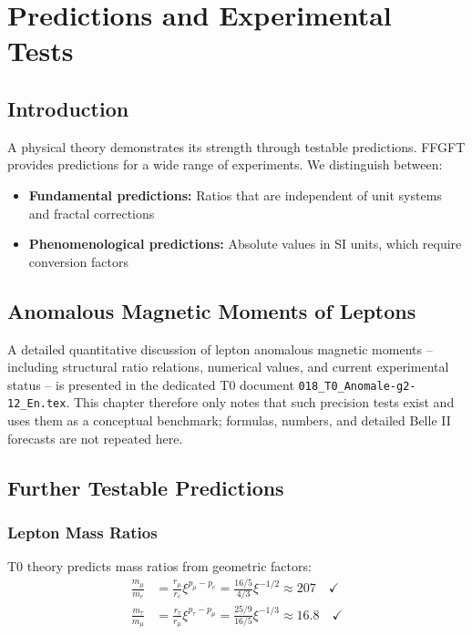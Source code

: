 
\chapter{Predictions and Experimental Tests}

\section{Introduction}

A physical theory demonstrates its strength through testable predictions. FFGFT provides predictions for a wide range of experiments. We distinguish between:

\begin{itemize}
	\item \textbf{Fundamental predictions:} Ratios that are independent of unit systems and fractal corrections
	\item \textbf{Phenomenological predictions:} Absolute values in SI units, which require conversion factors
\end{itemize}

\section{Anomalous Magnetic Moments of Leptons}

A detailed quantitative discussion of lepton anomalous magnetic moments – including structural ratio relations, numerical values, and current experimental status – is presented in the dedicated T0 document \texttt{018\_T0\_Anomale-g2-12\_En.tex}.
This chapter therefore only notes that such precision tests exist and uses them as a conceptual benchmark; formulas, numbers, and detailed Belle II forecasts are not repeated here.


\section{Further Testable Predictions}

\subsection{Lepton Mass Ratios}

T0 theory predicts mass ratios from geometric factors:
\begin{align}
	\frac{m_\mu}{m_e} &= \frac{r_\mu}{r_e} \xi^{p_\mu - p_e} = \frac{16/5}{4/3} \xi^{-1/2} 
	\approx 207 \quad \checkmark \\
	\frac{m_\tau}{m_\mu} &= \frac{r_\tau}{r_\mu} \xi^{p_\tau - p_\mu} = \frac{25/9}{16/5} \xi^{-1/3} 
	\approx 16.8 \quad \checkmark
\end{align}

